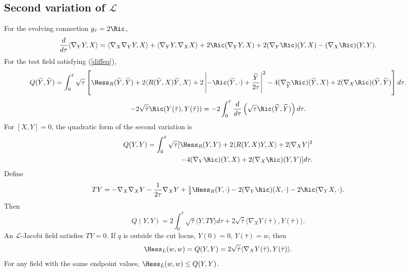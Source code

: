 \subsection{Second variation of ${\mathcal L}$}
For the evolving connection $g_\tau=2\Ric$,
\begin{equation}\label{xxx}
{d\over d\tau}\langle\nabla_YY,X\rangle
=\langle\nabla_X\nabla_YY,X\rangle+\langle\nabla_YY,\nabla_XX\rangle
+2\Ric(\nabla_YY,X)+2(\nabla_Y\Ric)(Y,X)-(\nabla_X\Ric)(Y,Y).
\end{equation}
For the test field satisfying (\ref{diffeq}),
\begin{equation}\label{sub1}
Q(\widetilde Y,\widetilde Y)=\int_0^{\bar\tau}\sqrt\tau\left[
\Hess_R(\widetilde Y,\widetilde Y)+2\langle R(\widetilde Y,X)\widetilde Y,X\rangle
+2\left|-\Ric(\widetilde Y,\cdot)+{\widetilde Y\over2\tau}\right|^2
-4(\nabla_{\widetilde Y}\Ric)(\widetilde Y,X)+2(\nabla_X\Ric)(\widetilde Y,\widetilde Y)\right]d\tau.
\end{equation}
\begin{equation}\label{sub2}
-2\sqrt{\bar\tau}\Ric(Y(\bar\tau),Y(\bar\tau))
=-2\int_0^{\bar\tau}{d\over d\tau}\left(\sqrt\tau\Ric(\widetilde Y,\widetilde Y)\right)d\tau.
\end{equation}
For $[X,Y]=0$, the quadratic form of the second variation is
\begin{align}\label{Hess}
Q(Y,Y)=\int_0^{\bar\tau}\sqrt\tau[\Hess_R(Y,Y)+2\langle R(Y,X)Y,X\rangle+2|\nabla_XY|^2\\
-4(\nabla_Y\Ric)(Y,X)+2(\nabla_X\Ric)(Y,Y)]d\tau.
\end{align}
Define
\begin{equation}
TY=-\nabla_X\nabla_XY-{1\over2\tau}\nabla_XY+\tfrac12\Hess_R(Y,\cdot)
-2(\nabla_Y\Ric)(X,\cdot)-2\Ric(\nabla_YX,\cdot).
\end{equation}
Then
\begin{equation}\label{Qeqn}Q(Y,Y)=2\int_0^{\bar\tau}\sqrt\tau\langle Y,TY\rangle d\tau
+2\sqrt{\bar\tau}\langle\nabla_XY(\bar\tau),Y(\bar\tau)\rangle.
\end{equation}
An ${\mathcal L}$-Jacobi field satisfies $TY=0$. If $q$ is outside the cut locus,
$Y(0)=0$, $Y(\bar\tau)=w$, then
\begin{equation}\label{hesseq}\Hess_L(w,w)=Q(Y,Y)=2\sqrt{\bar\tau}\langle\nabla_XY(\bar\tau),Y(\bar\tau)\rangle.
\end{equation}
For any field with the same endpoint values, $\Hess_L(w,w)\le Q(Y,Y)$.

